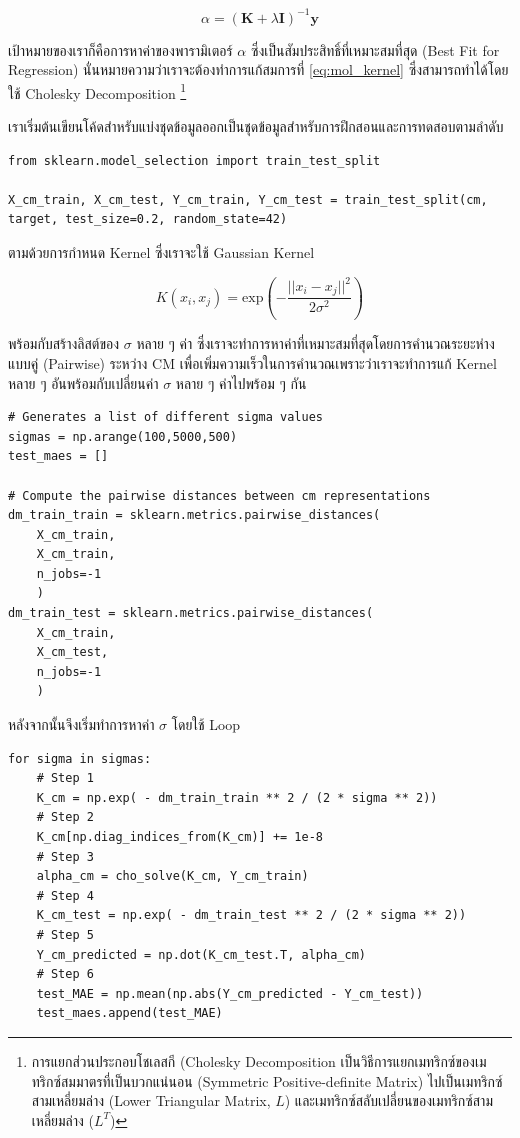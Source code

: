 \begin{equation}\label{eq:mol_kernel}
    \alpha = (\mathbf{K} + \lambda\mathbf{I} ) ^{-1} \mathbf{y}
\end{equation}

\noindent เป้าหมายของเราก็คือการหาค่าของพารามิเตอร์ $\alpha$ ซึ่งเป็นสัมประสิทธิ์ที่เหมาะสมที่สุด (Best Fit for Regression) 
นั่นหมายความว่าเราจะต้องทำการแก้สมการที่ \ref{eq:mol_kernel} ซึ่งสามารถทำได้โดยใช้ Cholesky Decomposition%
\footnote{การแยกส่วนประกอบโชเลสกี (Cholesky Decomposition เป็นวิธีการแยกเมทริกซ์ของเมทริกซ์สมมาตรที่เป็นบวกแน่นอน (Symmetric 
Positive-definite Matrix) ไปเป็นเมทริกซ์สามเหลี่ยมล่าง (Lower Triangular Matrix, $L$) และเมทริกซ์สลับเปลี่ยนของเมทริกซ์สาม%
เหลี่ยมล่าง ($L^{T}$)}

เราเริ่มต้นเขียนโค้ดสำหรับแบ่งชุดข้อมูลออกเป็นชุดข้อมูลสำหรับการฝึกสอนและการทดสอบตามลำดับ
\begin{lstlisting}[style=MyPython]
from sklearn.model_selection import train_test_split

X_cm_train, X_cm_test, Y_cm_train, Y_cm_test = train_test_split(cm, target, test_size=0.2, random_state=42)
\end{lstlisting}

\noindent ตามด้วยการกำหนด Kernel ซึ่งเราจะใช้ Gaussian Kernel 

\begin{equation}\label{eq:gaussian_kernel}
    K(x_{i}, x_{j}) = \mathrm{exp}\left( -\frac{||x_i-x_j||^2}{2\sigma^2} \right)
\end{equation}

\noindent พร้อมกับสร้างลิสต์ของ $\sigma$ หลาย ๆ ค่า ซึ่งเราจะทำการหาค่าที่เหมาะสมที่สุดโดยการคำนวณระยะห่างแบบคู่ (Pairwise) 
ระหว่าง CM เพื่อเพิ่มความเร็วในการคำนวณเพราะว่าเราจะทำการแก้ Kernel หลาย ๆ อันพร้อมกับเปลี่ยนค่า $\sigma$ หลาย ๆ ค่าไปพร้อม ๆ กัน

\begin{lstlisting}[style=MyPython]
# Generates a list of different sigma values
sigmas = np.arange(100,5000,500) 
test_maes = []

# Compute the pairwise distances between cm representations
dm_train_train = sklearn.metrics.pairwise_distances(
    X_cm_train, 
    X_cm_train, 
    n_jobs=-1
    )
dm_train_test = sklearn.metrics.pairwise_distances(
    X_cm_train, 
    X_cm_test, 
    n_jobs=-1
    )
\end{lstlisting}

\noindent หลังจากนั้นจึงเริ่มทำการหาค่า $\sigma$ โดยใช้ Loop

\begin{lstlisting}[style=MyPython]
for sigma in sigmas:
    # Step 1
    K_cm = np.exp( - dm_train_train ** 2 / (2 * sigma ** 2)) 
    # Step 2
    K_cm[np.diag_indices_from(K_cm)] += 1e-8
    # Step 3
    alpha_cm = cho_solve(K_cm, Y_cm_train)
    # Step 4
    K_cm_test = np.exp( - dm_train_test ** 2 / (2 * sigma ** 2))
    # Step 5
    Y_cm_predicted = np.dot(K_cm_test.T, alpha_cm)
    # Step 6
    test_MAE = np.mean(np.abs(Y_cm_predicted - Y_cm_test))
    test_maes.append(test_MAE)
\end{lstlisting}

